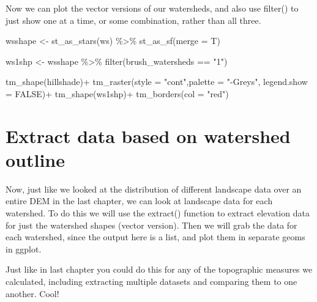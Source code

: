 \documentclass[
]{book}
\newenvironment{Shaded}{\begin{snugshade}}{\end{snugshade}}
\newcommand{\AttributeTok}[1]{\textcolor[rgb]{0.77,0.63,0.00}{#1}}
\newcommand{\ConstantTok}[1]{\textcolor[rgb]{0.00,0.00,0.00}{#1}}
\newcommand{\FunctionTok}[1]{\textcolor[rgb]{0.00,0.00,0.00}{#1}}
\newcommand{\NormalTok}[1]{#1}
\newcommand{\OtherTok}[1]{\textcolor[rgb]{0.56,0.35,0.01}{#1}}
\newcommand{\SpecialCharTok}[1]{\textcolor[rgb]{0.00,0.00,0.00}{#1}}
\newcommand{\StringTok}[1]{\textcolor[rgb]{0.31,0.60,0.02}{#1}}
\begin{document}
Now we can plot the vector versions of our watersheds, and also use filter() to just show one at a time, or some combination, rather than all three.

\begin{Shaded}
\begin{Highlighting}[]
\NormalTok{wsshape }\OtherTok{\textless{}{-}} \FunctionTok{st\_as\_stars}\NormalTok{(ws) }\SpecialCharTok{\%\textgreater{}\%} \FunctionTok{st\_as\_sf}\NormalTok{(}\AttributeTok{merge =}\NormalTok{ T)}

\NormalTok{ws1shp }\OtherTok{\textless{}{-}}\NormalTok{ wsshape }\SpecialCharTok{\%\textgreater{}\%} \FunctionTok{filter}\NormalTok{(brush\_watersheds }\SpecialCharTok{==} \StringTok{"1"}\NormalTok{)}

\FunctionTok{tm\_shape}\NormalTok{(hillshade)}\SpecialCharTok{+}
  \FunctionTok{tm\_raster}\NormalTok{(}\AttributeTok{style =} \StringTok{"cont"}\NormalTok{,}\AttributeTok{palette =} \StringTok{"{-}Greys"}\NormalTok{, }\AttributeTok{legend.show =} \ConstantTok{FALSE}\NormalTok{)}\SpecialCharTok{+}
\FunctionTok{tm\_shape}\NormalTok{(ws1shp)}\SpecialCharTok{+}
  \FunctionTok{tm\_borders}\NormalTok{(}\AttributeTok{col =} \StringTok{"red"}\NormalTok{)}
\end{Highlighting}
\end{Shaded}

\hypertarget{extract-data-based-on-watershed-outline}{%
\section{Extract data based on watershed outline}\label{extract-data-based-on-watershed-outline}}

Now, just like we looked at the distribution of different landscape data over an entire DEM in the last chapter, we can look at landscape data for each watershed. To do this we will use the extract() function to extract elevation data for just the watershed shapes (vector version). Then we will grab the data for each watershed, since the output here is a list, and plot them in separate geoms in ggplot.

Just like in last chapter you could do this for any of the topographic measures we calculated, including extracting multiple datasets and comparing them to one another. Cool!
\end{document}
